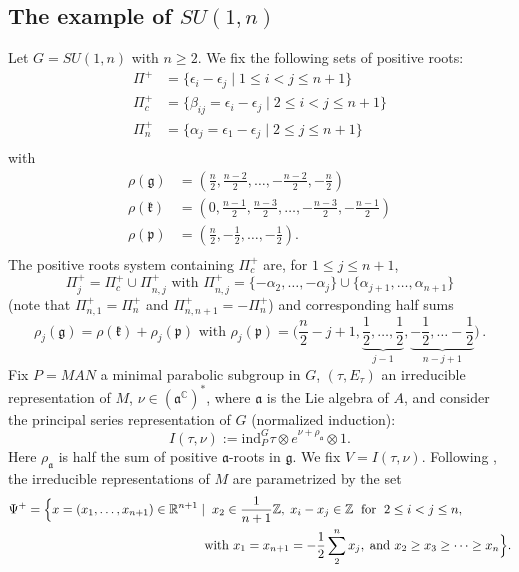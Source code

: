\documentclass{amsart}[draft,11pt]
\newcommand{\fg}{{\mathfrak{g}}}
\newcommand{\fk}{{\mathfrak{k}}}
\newcommand{\fp}{{\mathfrak{p}}}
\newcommand{\CC}{{\mathbb{C}}}
\numberwithin{equation}{section}
\theoremstyle{definition}
\begin{document}
\subsection{The example of $SU(1,n)$}
Let $G=SU(1,n)$ with $n\geq 2$. We fix the following sets of positive roots:
\begin{align*}
\Pi^+&=\{\epsilon_i-\epsilon_j\mid 1\leq i<j\leq n+1\}\\
\Pi^+_c&=\{\beta_{ij}=\epsilon_i-\epsilon_j\mid 2\leq i<j\leq n+1\}\\
\Pi^+_n&=\{\alpha_j=\epsilon_1-\epsilon_j\mid 2\leq j\leq n+1\}\\
\end{align*}
with 
\begin{align*}
\rho(\fg)&=(\frac{n}{2},\frac{n-2}{2},\ldots,-\frac{n-2}{2},-\frac{n}{2})\\
\rho(\fk)&=(0,\frac{n-1}{2},\frac{n-3}{2},\ldots,-\frac{n-3}{2},-\frac{n-1}{2})\\
\rho(\fp)&=(\frac{n}{2},-\frac{1}{2},\ldots,-\frac{1}{2}).\\
\end{align*}
The positive roots system containing $\Pi_c^+$ are,
for $1\leq j\leq n+1$,
$$
\Pi^+_j=\Pi_c^+ \cup \Pi_{n,j}^+
\text{ with }
\Pi_{n,j}^+=\{-\alpha_2,\ldots,-\alpha_j\}
\cup
\{\alpha_{j+1},\ldots,\alpha_{n+1}\}
$$
(note that $\Pi^+_{n,1}=\Pi_n^+$ and 
$\Pi^+_{n,n+1}=-\Pi_n^+$) and corresponding half sums
$$\rho_j(\fg)=\rho(\fk)+\rho_j(\fp)
\text{ with }
\rho_j(\fp)=\Big(\frac{n}{2}-j+1,\underbrace{\frac12,\ldots,
\frac12}_{j-1},\underbrace{-\frac12,\ldots -\frac12}_{n-j+1}\Big)\,.$$
Fix $P=MAN$ a minimal parabolic subgroup in $G$, $(\tau, E_\tau)$ an irreducible representation of $M$, $\nu\in({\mathfrak a}^\CC)^*$, where ${\mathfrak a}$ is the Lie algebra of $A$, and consider the principal series representation of $G$ (normalized induction):
\[
I(\tau,\nu):=\text{ind}_P^G\tau\otimes e^{\nu+\rho_{\mathfrak a}}\otimes 1.
\]
Here $\rho_{\mathfrak a}$ is half the sum of positive ${\mathfrak a}$-roots in ${\mathfrak g}$. 
We fix $V=I(\tau,\nu)$. 
Following \cite[Section 2]{Se}, the irreducible representations of $M$ are parametrized by the set 
\begin{align*}
\Psi^+&=
\Bigl\{
x=(x_1,\ldots,x_{n+1})\in{\mathbb R}^{n+1}\mid\;x_2\in\frac{1}{n+1}{\mathbb Z},\;x_i-x_j\in{\mathbb Z}\;\text{ for }\;2\leq i<j\leq n,\\
&
\phantom{
\Bigl\{
x=(x_0,\ldots,x_n)\in{\mathbb R}^{n+1}\mid x_1 \Bigr\}
}
\text{ with }x_1=x_{n+1}=-\frac{1}{2}\sum_{2}^{n}x_j,\; \text{and }x_2\geq x_3\geq\cdots\geq x_{n}
\Bigr\}.
\end{align*}
\end{document}

